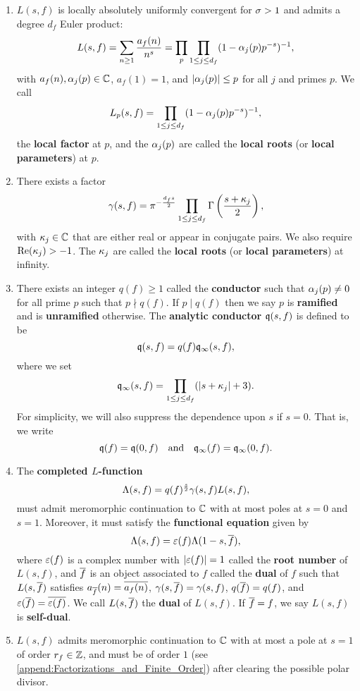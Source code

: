    \begin{enumerate}[label*=(\roman*)]
      \item $L(s,f)$ is locally absolutely uniformly convergent for $\sigma > 1$ and admits a degree $d_{f}$ Euler product:
      \[
        L(s,f) = \sum_{n \ge 1}\frac{a_{f}(n)}{n^{s}} = \prod_{p}\prod_{1 \le j \le d_{f}}(1-\alpha_{j}(p)p^{-s})^{-1},
      \]
      with $a_{f}(n),\alpha_{j}(p) \in \mathbb{C}$, $a_{f}(1) = 1$, and $|\alpha_{j}(p)| \le p$ for all $j$ and primes $p$. We call
      \[
        L_{p}(s,f) = \prod_{1 \le j \le d_{f}}(1-\alpha_{j}(p)p^{-s})^{-1},
      \]
      the \textbf{local factor} at $p$, and the $\alpha_{j}(p)$ are called the \textbf{local roots} (or \textbf{local parameters}) at $p$.
      \item There exists a factor
      \[
        \gamma(s,f) = \pi^{-\frac{d_{f}s}{2}}\prod_{1 \le j \le d_{f}}\Gamma\left(\frac{s+\kappa_{j}}{2}\right),
      \]
      with $\kappa_{j} \in \mathbb{C}$ that are either real or appear in conjugate pairs. We also require $\mathrm{Re}(\kappa_{j}) > -1$. The $\kappa_{j}$ are called the \textbf{local roots} (or \textbf{local parameters}) at infinity.
      \item There exists an integer $q(f) \ge 1$ called the \textbf{conductor} such that $\alpha_{j}(p) \neq 0$ for all prime $p$ such that $p \nmid q(f)$. If $p \mid q(f)$ then we say $p$ is \textbf{ramified} and is \textbf{unramified} otherwise. The \textbf{analytic conductor} $\mathfrak{q}(s,f)$ is defined to be
      \[
        \mathfrak{q}(s,f) = q(f)\mathfrak{q}_{\infty}(s,f),
      \]
      where we set
      \[
        \mathfrak{q}_{\infty}(s,f) = \prod_{1 \le j \le d_{f}}(|s+\kappa_{j}|+3).
      \]
      For simplicity, we will also suppress the dependence upon $s$ if $s = 0$. That is, we write
      \[
        \mathfrak{q}(f) = \mathfrak{q}(0,f) \quad \text{and} \quad \mathfrak{q}_{\infty}(f) = \mathfrak{q}_{\infty}(0,f).
      \]
      \item The \textbf{completed $L$-function}
      \[
        \Lambda(s,f) = q(f)^{\frac{s}{2}}\gamma(s,f)L(s,f),
      \]
      must admit meromorphic continuation to $\mathbb{C}$ with at most poles at $s = 0$ and $s = 1$. Moreover, it must satisfy the \textbf{functional equation} given by
      \[
        \Lambda(s,f) = \varepsilon(f)\Lambda(1-s,\overline{f}),
      \]
      where $\varepsilon(f)$ is a complex number with $|\varepsilon(f)| = 1$ called the \textbf{root number} of $L(s,f)$, and $\overline{f}$ is an object associated to $f$ called the \textbf{dual} of $f$ such that $L(s,\overline{f})$ satisfies $a_{\overline{f}}(n) = \overline{a_{f}(n)}$, $\gamma(s,\overline{f}) = \gamma(s,f)$, $q(\overline{f}) = q(f)$, and $\varepsilon(\overline{f}) = \overline{\varepsilon(f)}$. We call $L(s,\overline{f})$ the \textbf{dual} of $L(s,f)$. If $\overline{f} = f$, we say $L(s,f)$ is \textbf{self-dual}.
      \item $L(s,f)$ admits meromorphic continuation to $\mathbb{C}$ with at most a pole at $s = 1$ of order $r_{f} \in \mathbb{Z}$, and must be of order $1$ (see \cref{append:Factorizations_and_Finite_Order}) after clearing the possible polar divisor.
    \end{enumerate}
